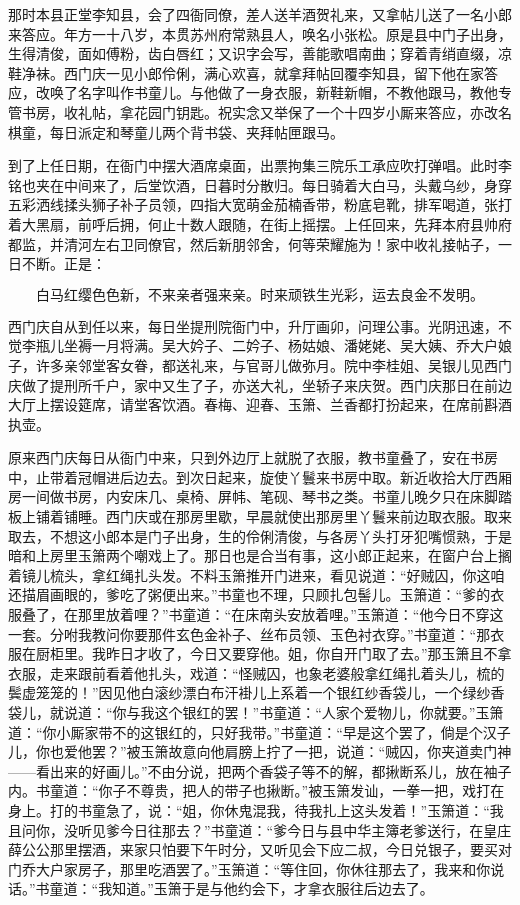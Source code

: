 那时本县正堂李知县，会了四衙同僚，差人送羊酒贺礼来，又拿帖儿送了一名小郎来答应。年方一十八岁，本贯苏州府常熟县人，唤名小张松。原是县中门子出身，生得清俊，面如傅粉，齿白唇红；又识字会写，善能歌唱南曲；穿着青绡直缀，凉鞋净袜。西门庆一见小郎伶俐，满心欢喜，就拿拜帖回覆李知县，留下他在家答应，改唤了名字叫作书童儿。与他做了一身衣服，新鞋新帽，不教他跟马，教他专管书房，收礼帖，拿花园门钥匙。祝实念又举保了一个十四岁小厮来答应，亦改名棋童，每日派定和琴童儿两个背书袋、夹拜帖匣跟马。

到了上任日期，在衙门中摆大酒席桌面，出票拘集三院乐工承应吹打弹唱。此时李铭也夹在中间来了，后堂饮酒，日暮时分散归。每日骑着大白马，头戴乌纱，身穿五彩洒线揉头狮子补子员领，四指大宽萌金茄楠香带，粉底皂靴，排军喝道，张打着大黑扇，前呼后拥，何止十数人跟随，在街上摇摆。上任回来，先拜本府县帅府都监，并清河左右卫同僚官，然后新朋邻舍，何等荣耀施为！家中收礼接帖子，一日不断。正是：

\[
白马红缨色色新，不来亲者强来亲。
时来顽铁生光彩，运去良金不发明。
\]

西门庆自从到任以来，每日坐提刑院衙门中，升厅画卯，问理公事。光阴迅速，不觉李瓶儿坐褥一月将满。吴大妗子、二妗子、杨姑娘、潘姥姥、吴大姨、乔大户娘子，许多亲邻堂客女眷，都送礼来，与官哥儿做弥月。院中李桂姐、吴银儿见西门庆做了提刑所千户，家中又生了子，亦送大礼，坐轿子来庆贺。西门庆那日在前边大厅上摆设筵席，请堂客饮酒。春梅、迎春、玉箫、兰香都打扮起来，在席前斟酒执壶。

原来西门庆每日从衙门中来，只到外边厅上就脱了衣服，教书童叠了，安在书房中，止带着冠帽进后边去。到次日起来，旋使丫鬟来书房中取。新近收拾大厅西厢房一间做书房，内安床几、桌椅、屏帏、笔砚、琴书之类。书童儿晚夕只在床脚踏板上铺着铺睡。西门庆或在那房里歇，早晨就使出那房里丫鬟来前边取衣服。取来取去，不想这小郎本是门子出身，生的伶俐清俊，与各房丫头打牙犯嘴惯熟，于是暗和上房里玉箫两个嘲戏上了。那日也是合当有事，这小郎正起来，在窗户台上搁着镜儿梳头，拿红绳扎头发。不料玉箫推开门进来，看见说道：“好贼囚，你这咱还描眉画眼的，爹吃了粥便出来。”书童也不理，只顾扎包髻儿。玉箫道：“爹的衣服叠了，在那里放着哩？”书童道：“在床南头安放着哩。”玉箫道：“他今日不穿这一套。分咐我教问你要那件玄色\textKouBian 金补子、丝布员领、玉色衬衣穿。”书童道：“那衣服在厨柜里。我昨日才收了，今日又要穿他。姐，你自开门取了去。”那玉箫且不拿衣服，走来跟前看着他扎头，戏道：“怪贼囚，也象老婆般拿红绳扎着头儿，梳的鬓虚笼笼的！”因见他白滚纱漂白布汗褂儿上系着一个银红纱香袋儿，一个绿纱香袋儿，就说道：“你与我这个银红的罢！”书童道：“人家个爱物儿，你就要。”玉箫道：“你小厮家带不的这银红的，只好我带。”书童道：“早是这个罢了，倘是个汉子儿，你也爱他罢？”被玉箫故意向他肩膀上拧了一把，说道：“贼囚，你夹道卖门神——看出来的好画儿。”不由分说，把两个香袋子等不的解，都揪断系儿，放在袖子内。书童道：“你子不尊贵，把人的带子也揪断。”被玉箫发讪，一拳一把，戏打在身上。打的书童急了，说：“姐，你休鬼混我，待我扎上这头发着！”玉箫道：“我且问你，没听见爹今日往那去？”书童道：“爹今日与县中华主簿老爹送行，在皇庄薛公公那里摆酒，来家只怕要下午时分，又听见会下应二叔，今日兑银子，要买对门乔大户家房子，那里吃酒罢了。”玉箫道：“等住回，你休往那去了，我来和你说话。”书童道：“我知道。”玉箫于是与他约会下，才拿衣服往后边去了。

